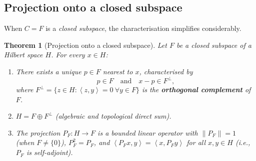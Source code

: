 \documentclass[a4paper,12pt]{book}
\newcommand{\norm}[1]{\left\| #1 \right\|}
\newcommand{\inner}[2]{\left\langle #1, #2 \right\rangle}
\theoremstyle{definition}
\theoremstyle{plain}
\newtheorem{theorem}[definition]{Theorem}
\theoremstyle{remark}
\begin{document}
\subsection{Projection onto a closed subspace}
\label{ssec:projection-subspace}

When $C=F$ is a \emph{closed subspace}, the
characterisation simplifies considerably.

\begin{theorem}[Projection onto a closed subspace]
\label{thm:projection-subspace}
Let $F$ be a closed subspace of a Hilbert space $H$.  For every $x\in H$:
\begin{enumerate}[label=\textup{(\roman*)}]
  \item There exists a unique $p\in F$ nearest to $x$, characterised by
    \begin{equation}\label{eq:proj-subspace}
      p\in F \quad\text{and}\quad x-p\in F^\perp,
    \end{equation}
    where $F^\perp = \{z\in H:\inner{z}{y}=0\ \forall y\in F\}$ is the
    \textbf{orthogonal complement} of $F$.
  \item $H = F \oplus F^\perp$ (algebraic and topological direct sum).
  \item The projection $P_F:H\to F$ is a bounded linear operator with
    $\norm{P_F}=1$ (when $F\ne\{0\}$), $P_F^2=P_F$, and
    $\inner{P_Fx}{y}=\inner{x}{P_Fy}$ for all $x,y\in H$ (i.e., $P_F$
    is self-adjoint).
\end{enumerate}
\end{theorem}
\end{document}
